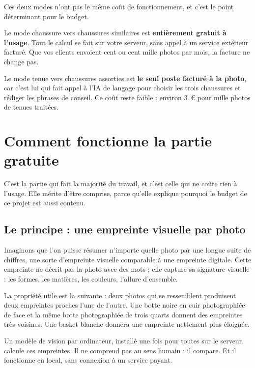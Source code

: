 \documentclass[11pt,a4paper]{article}
\begin{document}
\vspace{1em}
Ces deux modes n'ont pas le même coût de fonctionnement, et c'est le point
déterminant pour le budget.

Le mode chaussure vers chaussures similaires est \textbf{entièrement gratuit à
l'usage}. Tout le calcul se fait sur votre serveur, sans appel à un service
extérieur facturé. Que vos clients envoient cent ou cent mille photos par mois,
la facture ne change pas.

Le mode tenue vers chaussures assorties est \textbf{le seul poste facturé à la
photo}, car c'est lui qui fait appel à l'IA de langage pour choisir les trois
chaussures et rédiger les phrases de conseil. Ce coût reste faible : environ
3~€ pour mille photos de tenues traitées.

\section{Comment fonctionne la partie gratuite}
\label{sec:sansllm}

C'est la partie qui fait la majorité du travail, et c'est celle qui ne coûte
rien à l'usage. Elle mérite d'être comprise, parce qu'elle explique pourquoi le
budget de ce projet est aussi contenu.

\subsection{Le principe : une empreinte visuelle par photo}

Imaginons que l'on puisse résumer n'importe quelle photo par une longue suite de
chiffres, une sorte d'empreinte visuelle comparable à une empreinte digitale.
Cette empreinte ne décrit pas la photo avec des mots ; elle capture sa signature
visuelle : les formes, les matières, les couleurs, l'allure d'ensemble.

La propriété utile est la suivante : deux photos qui se ressemblent produisent
deux empreintes proches l'une de l'autre. Une botte noire en cuir photographiée
de face et la même botte photographiée de trois quarts donnent des empreintes
très voisines. Une basket blanche donnera une empreinte nettement plus éloignée.

Un modèle de vision par ordinateur, installé une fois pour toutes sur le
serveur, calcule ces empreintes. Il ne comprend pas au sens humain : il compare.
Et il fonctionne en local, sans connexion à un service payant.
\end{document}

